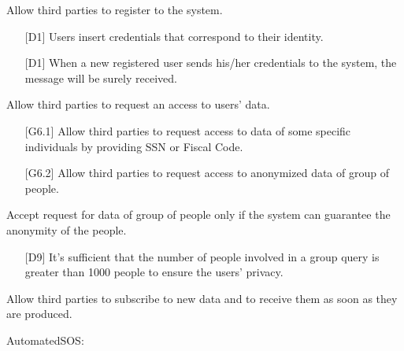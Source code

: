 \begin{enumerate} [label={[G\arabic*]}]
    \item Allow third parties to register to the system.
        \begin{itemize}
            \item [{[D1]}] Users insert credentials that correspond to their identity.
            \item [{[D1]}] When a new registered user sends his/her credentials to the system, the message will be surely received.
        \end{itemize}
        
    \item Allow third parties to request an access to users' data.
    \begin{enumerate} [label*={.\arabic*}]
        \item [{[G6.1]}] Allow third parties to request access to data of some specific individuals by providing SSN or Fiscal Code.
        \item [{[G6.2]}] Allow third parties to request access to anonymized data of group of people.
    \end{enumerate}
    
    \item Accept request for data of group of people only if the system can guarantee the anonymity of the people.
        \begin{itemize}
            \item [{[D9]}] It’s sufficient that the number of people involved in a group query is greater than 1000 people to ensure the users’ privacy.
        \end{itemize}
        
    \item Allow third parties to subscribe to new data and to receive them as soon as they are produced.
\end{enumerate}  
\noindent
AutomatedSOS:
